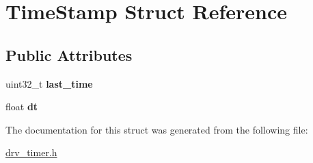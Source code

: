 \hypertarget{struct_time_stamp}{}\section{Time\+Stamp Struct Reference}
\label{struct_time_stamp}
\subsection*{Public Attributes}
\begin{DoxyCompactItemize}
\item 
\mbox{\label{struct_time_stamp_ac0b03b8a42363a0930218f136e30ae97}} 
uint32\+\_\+t {\bfseries last\+\_\+time}
\item 
\mbox{\label{struct_time_stamp_a20a7dad014537b3761f491e660f6828e}} 
float {\bfseries dt}
\end{DoxyCompactItemize}


The documentation for this struct was generated from the following file\+:\begin{DoxyCompactItemize}
\item 
\hyperlink{drv__timer_8h}{drv\+\_\+timer.\+h}\end{DoxyCompactItemize}
